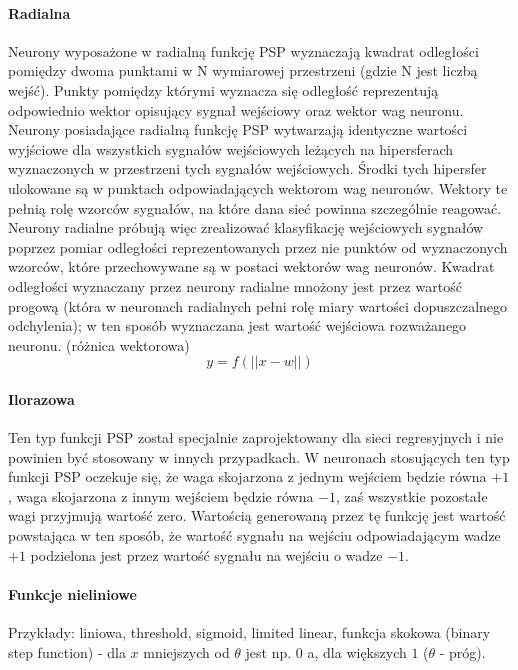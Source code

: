\paragraph{Radialna} Neurony wyposażone w radialną funkcję PSP wyznaczają
kwadrat odległości pomiędzy dwoma punktami w N wymiarowej przestrzeni
(gdzie N jest liczbą wejść). Punkty pomiędzy którymi wyznacza się
odległość reprezentują odpowiednio wektor opisujący sygnał wejściowy
oraz wektor wag neuronu. Neurony posiadające radialną funkcję PSP
wytwarzają identyczne wartości wyjściowe dla wszystkich sygnałów
wejściowych leżących na hipersferach wyznaczonych w przestrzeni tych
sygnałów wejściowych. Środki tych hipersfer ulokowane są w punktach
odpowiadających wektorom wag neuronów. Wektory te pełnią rolę wzorców
sygnałów, na które dana sieć powinna szczególnie reagować. Neurony
radialne próbują więc zrealizować klasyfikację wejściowych sygnałów
poprzez pomiar odległości reprezentowanych przez nie punktów od
wyznaczonych wzorców, które przechowywane są w postaci wektorów wag
neuronów. Kwadrat odległości wyznaczany przez neurony radialne mnożony
jest przez wartość progową (która w neuronach radialnych pełni rolę miary
wartości dopuszczalnego odchylenia); w ten sposób wyznaczana jest wartość
wejściowa rozważanego neuronu.
(różnica wektorowa)
\begin{equation}
 y = f( || x - w || )
\end{equation}


\paragraph{Ilorazowa}

Ten typ funkcji PSP został specjalnie
zaprojektowany dla sieci regresyjnych i nie
powinien być stosowany w innych przypadkach. W
neuronach stosujących ten typ funkcji PSP oczekuje
się, że waga skojarzona z jednym wejściem będzie
równa $+1$, waga skojarzona z innym wejściem
będzie równa $-1$, zaś wszystkie pozostałe wagi
przyjmują wartość zero. Wartością generowaną
przez tę funkcję jest wartość powstająca w ten
sposób, że wartość sygnału na wejściu
odpowiadającym wadze $+1$ podzielona jest przez
wartość sygnału na wejściu o wadze $-1$.

\paragraph{Funkcje nieliniowe}

Przykłady: liniowa, threshold, sigmoid, limited linear, funkcja skokowa (binary step function)
- dla $x$ mniejszych od $\theta$ jest np. $0$ a, dla większych $1$ ($\theta$ - próg).

